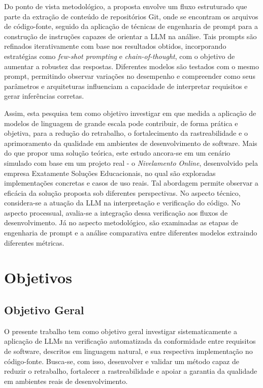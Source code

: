 Do ponto de vista metodológico, a proposta envolve um fluxo estruturado que parte da extração de conteúdo de repositórios Git, onde se encontram os arquivos de código-fonte, seguido da aplicação de técnicas de engenharia de prompt para a construção de instruções capazes de orientar a LLM na análise. Tais prompts são refinados iterativamente com base nos resultados obtidos, incorporando estratégias como \textit{few-shot prompting} e \textit{chain-of-thought}, com o objetivo de aumentar a robustez das respostas. Diferentes modelos são testados com o mesmo prompt, permitindo observar variações no desempenho e compreender como seus parâmetros e arquiteturas influenciam a capacidade de interpretar requisitos e gerar inferências corretas.

Assim, esta pesquisa tem como objetivo investigar em que medida a aplicação de modelos de linguagem de grande escala pode contribuir, de forma prática e objetiva, para a redução do retrabalho, o fortalecimento da rastreabilidade e o aprimoramento da qualidade em ambientes de desenvolvimento de software. Mais do que propor uma solução teórica, este estudo ancora-se em um cenário simulado com base em um projeto real - o \textit{Nivelamento Online}, desenvolvido pela empresa Exatamente Soluções Educacionais, no qual são exploradas implementações concretas e casos de uso reais. Tal abordagem permite observar a eficácia da solução proposta sob diferentes perspectivas. No aspecto técnico, considera-se a atuação da LLM na interpretação e verificação do código. No aspecto processual, avalia-se a integração dessa verificação aos fluxos de desenvolvimento. Já no aspecto metodológico, são examinadas as etapas de engenharia de prompt e a análise comparativa entre diferentes modelos extraindo diferentes métricas.

\section{Objetivos}

\subsection{Objetivo Geral}
O presente trabalho tem como objetivo geral investigar sistematicamente a aplicação de LLMs na verificação automatizada da conformidade entre requisitos de software, descritos em linguagem natural, e sua respectiva implementação no código-fonte. Busca-se, com isso, desenvolver e validar um método capaz de reduzir o retrabalho, fortalecer a rastreabilidade e apoiar a garantia da qualidade em ambientes reais de desenvolvimento.


